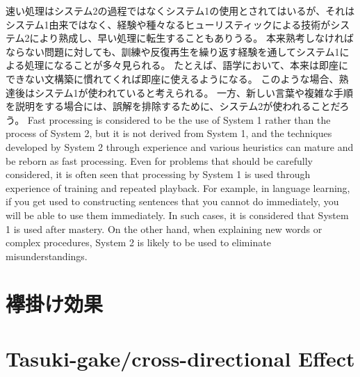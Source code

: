 \documentclass[a4paper,xelatex,ja=standard]{bxjsarticle}
\begin{document}
\ifJPN
速い処理はシステム2の過程ではなくシステム1の使用とされてはいるが、それはシステム1由来ではなく、経験や種々なるヒューリスティックによる技術がシステム2により熟成し、早い処理に転生することもありうる\autocite{Evans2008}。
本来熟考しなければならない問題に対しても、訓練や反復再生を繰り返す経験を通してシステム1による処理になることが多々見られる。
たとえば、語学において、本来は即座にできない文構築に慣れてくれば即座に使えるようになる。
このような場合、熟達後はシステム1が使われていると考えられる。
一方、新しい言葉や複雑な手順を説明をする場合には、誤解を排除するために、システム2が使われることだろう。
\else
  Fast processing is considered to be the use of System 1 rather than the process of System 2, but it is not derived from System 1, and the techniques developed by System 2 through experience and various heuristics can mature and be reborn as fast processing.\autocite{Evans2008}
Even for problems that should be carefully considered, it is often seen that processing by System 1 is used through experience of training and repeated playback.
For example, in language learning, if you get used to constructing sentences that you cannot do immediately, you will be able to use them immediately.
In such cases, it is considered that System 1 is used after mastery.
On the other hand, when explaining new words or complex procedures, System 2 is likely to be used to eliminate misunderstandings.
\fi

\ifJPN
  \section{襷掛け効果}
\else
  \section{Tasuki-gake/cross-directional Effect}
\fi
\end{document}
